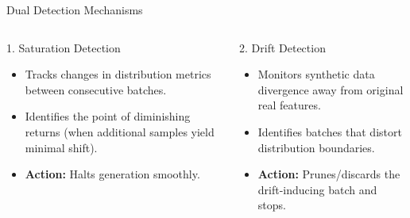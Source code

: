 \documentclass[10pt]{beamer}
\begin{document}
\begin{frame}{Dual Detection Mechanisms}
    \begin{columns}
        \begin{block}{1. Saturation Detection}
            \begin{itemize}
                \item Tracks changes in distribution metrics between consecutive batches.
                \item Identifies the point of diminishing returns (when additional samples yield minimal shift).
                \item \textbf{Action:} Halts generation smoothly.
            \end{itemize}
        \end{block}

        \begin{block}{2. Drift Detection}
            \begin{itemize}
                \item Monitors synthetic data divergence away from original real features.
                \item Identifies batches that distort distribution boundaries.
                \item \textbf{Action:} Prunes/discards the drift-inducing batch and stops.
            \end{itemize}
        \end{block}
    \end{columns}
\end{frame}
\end{document}
